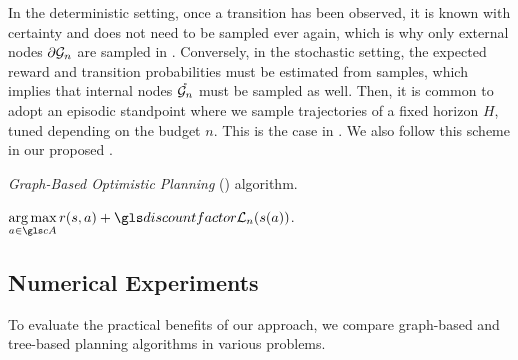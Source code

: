 In the deterministic setting, once a transition has been observed, it is known with certainty and does not need to be sampled ever again, which is why only external nodes ${\partial \mathcal{G}_n}$ are sampled in \GBOPD. Conversely, in the stochastic setting, the expected reward and transition probabilities must be estimated from samples, which implies that internal nodes $\mathring{\mathcal{G}_n}$ must be sampled as well. Then, it is common to adopt an episodic standpoint where we sample trajectories of a fixed horizon $H$, tuned depending on the budget $n$. This is the case in  \citep[\eg][]{Kearns02SS,Kocsis2006,Bubeck2010,Feldman14BRUE,Leurent2020practical,Jonsson2020planning}. We also follow this scheme in our proposed .

\begin{algorithm}[ht]
	\caption{\emph{Graph-Based Optimistic Planning} (\GBOP) algorithm.}
	\label{alg:gbop}
	\DontPrintSemicolon
	\Return $\displaystyle\argmax_{a\in \cA} r(s,a) + \discount \cL_n(s(a))$. 
\end{algorithm}

\subsection{Numerical Experiments}
\label{sec:gbop-experiments}

To evaluate the practical benefits of our approach, we compare graph-based and tree-based planning algorithms in various problems.

